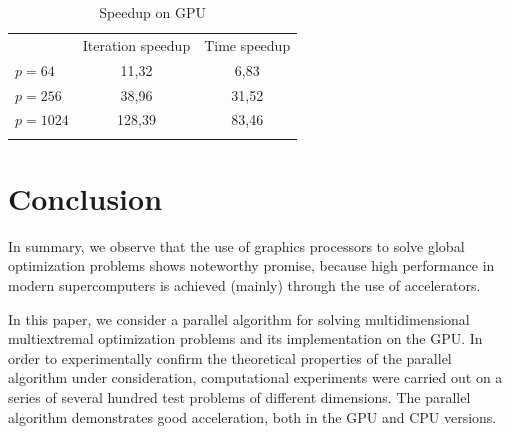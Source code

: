 \documentclass{svproc}
\begin{document}
\begin{table}
                \caption{Speedup on GPU}
                \label{table:GKLS6_average_MMAS_GPU}
                \center
                \begin{tabular}{lcc}
                &  Iteration speedup &   Time speedup\\

                               \noalign{\smallskip} \hline \noalign{\smallskip}                               
                               $p=64$  &    11,32	 & 6,83	  \\
                               $p=256$ &    38,96	 & 31,52  \\
							   $p=1024$&    128,39	 & 83,46  \\
                               \noalign{\smallskip}\hline
                \end{tabular}
\end{table}


\section{Conclusion}

In summary, we observe that the use of graphics processors to solve global optimization problems shows noteworthy promise, because high performance in modern supercomputers is achieved (mainly) through the use of accelerators.

In this paper, we consider a parallel algorithm for solving multidimensional multiextremal optimization problems and its implementation on the GPU. In order to experimentally confirm the theoretical properties of the parallel algorithm under consideration, computational experiments were carried out on a series of several hundred test problems of different dimensions. The parallel algorithm demonstrates good acceleration, both in the GPU and CPU versions.


%
%

{}
\end{document}
